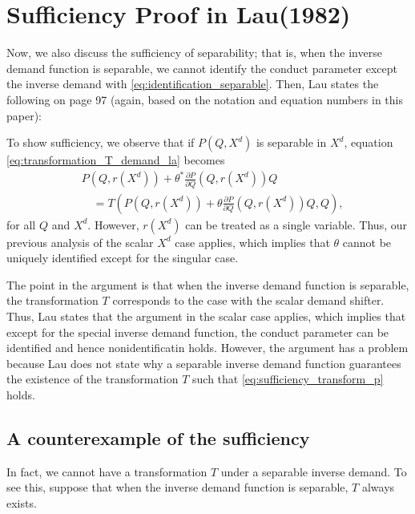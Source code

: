 \documentclass[11pt, a4paper]{article}
\theoremstyle{remark}
\begin{document}
\section{Sufficiency Proof in Lau(1982)}\label{sec:proof_lau_sufficiency}
Now, we also discuss the sufficiency of separability; that is, when the inverse demand function is separable, we cannot identify the conduct parameter except the inverse demand with \eqref{eq:identification_separable}.
Then, Lau states the following on page 97 (again, based on the notation and equation numbers in this paper):
\begin{framed}
To show sufficiency, we observe that if $P(Q, X^{d})$ is separable in $X^{d}$, equation \eqref{eq:transformation_T_demand_la} becomes 
\begin{align}
    & P(Q, r(X^{d})) + \theta^* \frac{\partial P}{\partial Q} (Q, r(X^{d})) Q \\
    &\quad = T \left( P(Q, r(X^{d})) + \theta \frac{\partial P}{\partial Q} (Q, r(X^{d})) Q, Q \right), \label{eq:sufficiency_transform_p}
\end{align}
for all $Q$ and $ X^{d}$.
However, $r(X^{d})$ can be treated as a single variable. Thus, our previous analysis of the scalar $X^{d}$ case applies, which implies that $\theta$ cannot be uniquely identified except for the singular case.
\end{framed}


The point in the argument is that when the inverse demand function is separable, the transformation $T$ corresponds to the case with the scalar demand shifter.
Thus, Lau states that the argument in the scalar case applies, which implies that except for the special inverse demand function, the conduct parameter can be identified and hence nonidentificatin holds.
However, the argument has a problem because Lau does not state why a separable inverse demand function guarantees the existence of the transformation $T$ such that \eqref{eq:sufficiency_transform_p} holds.




\subsection{A counterexample of the sufficiency} \label{sec:counterexample_sufficiency}

In fact, we cannot have a transformation $T$ under a separable inverse demand.
To see this, suppose that when the inverse demand function is separable, $T$ always exists.
\end{document}
